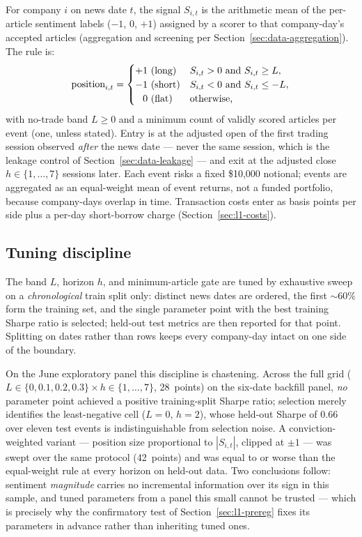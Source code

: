 For company $i$ on news date $t$, the signal $S_{i,t}$ is the
arithmetic mean of the per-article sentiment labels
($-1$, $0$, $+1$) assigned by a scorer to that company-day's accepted
articles (aggregation and screening per
Section~\ref{sec:data-aggregation}). The rule is:
\[
  \text{position}_{i,t} =
  \begin{cases}
    +1 \text{ (long)}  & S_{i,t} > 0 \text{ and } S_{i,t} \geq L,\\
    -1 \text{ (short)} & S_{i,t} < 0 \text{ and } S_{i,t} \leq -L,\\
    \hphantom{+}0 \text{ (flat)} & \text{otherwise,}
  \end{cases}
\]
with no-trade band $L \geq 0$ and a minimum count of validly scored
articles per event (one, unless stated). Entry is at the adjusted open
of the first trading session observed \emph{after} the news date ---
never the same session, which is the leakage control of
Section~\ref{sec:data-leakage} --- and exit at the adjusted close
$h \in \{1,\dots,7\}$ sessions later. Each event risks a fixed
\$10{,}000 notional; events are aggregated as an equal-weight mean of
event returns, not a funded portfolio, because company-days overlap in
time. Transaction costs enter as basis points per side plus a per-day
short-borrow charge (Section~\ref{sec:l1-costs}).

\subsection{Tuning discipline}
\label{sec:l1-tuning}

The band $L$, horizon $h$, and minimum-article gate are tuned by
exhaustive sweep on a \emph{chronological} train split only: distinct
news dates are ordered, the first ${\sim}60\%$ form the training set,
and the single parameter point with the best training Sharpe ratio is
selected; held-out test metrics are then reported for that point.
Splitting on dates rather than rows keeps every company-day intact on
one side of the boundary.

On the June exploratory panel this discipline is chastening. Across
the full grid ($L \in \{0, 0.1, 0.2, 0.3\} \times h \in \{1,\dots,7\}$,
28~points) on the six-date backfill panel, \emph{no} parameter point
achieved a positive training-split Sharpe ratio; selection merely
identifies the least-negative cell ($L=0$, $h=2$), whose held-out
Sharpe of $0.66$ over eleven test events is indistinguishable from
selection noise. A conviction-weighted variant --- position size
proportional to $|S_{i,t}|$, clipped at $\pm 1$ --- was swept over the
same protocol (42~points) and was equal to or worse than the
equal-weight rule at every horizon on held-out data. Two conclusions
follow: sentiment \emph{magnitude} carries no incremental information
over its sign in this sample, and tuned parameters from a panel this
small cannot be trusted --- which is precisely why the confirmatory
test of Section~\ref{sec:l1-prereg} fixes its parameters in advance
rather than inheriting tuned ones.

